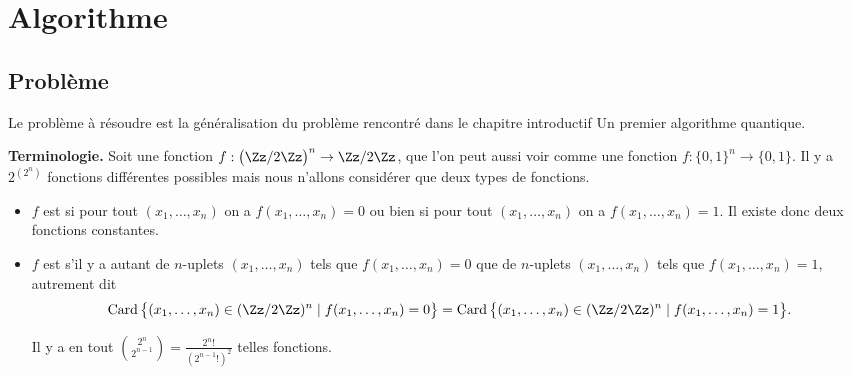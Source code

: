 \documentclass[11pt,class=report,crop=false]{standalone}
\begin{document}





\section{Algorithme}

\subsection{Problème}

Le problème à résoudre est la généralisation du problème rencontré dans le chapitre introductif \og{}Un premier algorithme quantique\fg{}.

\textbf{Terminologie.}
Soit une fonction $f : \big(\Zz/2\Zz\big)^n \to \Zz/2\Zz$, que l'on peut aussi voir comme une fonction $f : \{0,1\}^n \to \{0,1\}$. Il y a $2^{(2^n)}$ fonctions différentes possibles mais nous n'allons considérer que deux types de fonctions.
\begin{itemize}
  \item $f$ est  si pour tout $(x_1,\ldots,x_n)$ on a $f(x_1,\ldots,x_n)=0$
ou bien si pour tout $(x_1,\ldots,x_n)$ on a $f(x_1,\ldots,x_n)=1$. 
Il existe donc deux fonctions constantes.

  \item $f$ est  s'il y a autant de $n$-uplets $(x_1,\ldots,x_n)$ tels que $f(x_1,\ldots,x_n)=0$ que de $n$-uplets $(x_1,\ldots,x_n)$ tels que $f(x_1,\ldots,x_n)=1$, autrement dit 
$$\operatorname{Card}\big\{ (x_1,\ldots,x_n) \in (\Zz/2\Zz)^n \mid f(x_1,\ldots,x_n)=0 \big\}
= \operatorname{Card}\big\{ (x_1,\ldots,x_n) \in (\Zz/2\Zz)^n \mid f(x_1,\ldots,x_n)=1 \big\}.$$

Il y a en tout $\binom{2^n}{2^{n-1}} = \frac{2^n!}{(2^{n-1}!)^2}$ telles fonctions. 

\end{itemize}
\end{document}
